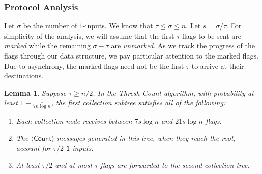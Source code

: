 \documentclass[11pt,letter]{article}
\newcommand{\alg}[1]{\mbox{\textsf{#1}}}
\theoremstyle{mytheoremstyle}
\newtheorem{lemma}{Lemma}
\newcommand{\countm}{$\langle\mathsf{Count}\rangle$\xspace}
\newcommand{\oneinputs}{$\mathsf{1}$-inputs\xspace}
\begin{document}
\subsubsection{Protocol Analysis}
Let $\sigma$ be the number of \oneinputs. We know that $\tau \le \sigma \le n$. Let $s=\sigma/\tau$.
For simplicity of the analysis, we will assume that the first $\tau$ flags to be sent are \emph{marked} while the remaining $\sigma -\tau$ are
\emph{unmarked}. As we track the progress of the flags through our data structure, we pay particular attention to the marked flags. Due to asynchrony, the marked flags need not be the first $\tau$ to arrive at their destinations.
\begin{lemma}\label{lem:bigtau}
	Suppose $\tau \ge n/2$.
	In the \alg{Thresh-Count} algorithm, with probability at least $1- \frac{1}{7n\log{n}}$, the first collection subtree satisfies all of the following:
	\begin{enumerate}
		\item Each collection node receives between $7s\log{n}$  and
		$21s\log{n}$ flags.
		\item The \countm messages generated in this tree, when they reach
		the root, account for $\tau/2$ \oneinputs.
		\item At least $\tau/2$ and at most $\tau$ flags are forwarded to the
		second collection tree.
	\end{enumerate}
\end{lemma}
\end{document}
